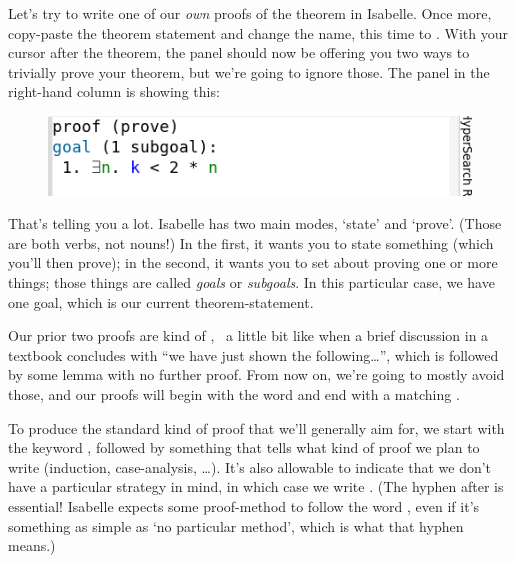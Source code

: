 
Let's try to write one of our \textit{own} proofs of the theorem in Isabelle. Once more, copy-paste the theorem statement and change the name, this time to . With your cursor after the theorem, the  panel should now be offering you two ways to trivially prove your theorem, but we're going to ignore those. The  panel in the right-hand column is showing this:
\begin{figure}[h]
    \includegraphics[width=0.75\linewidth]{TEXT/C01/Images/state-panel.png}
\end{figure}

That's telling you a lot. Isabelle has two main modes, `state' and `prove'. (Those are both verbs, not nouns!) In the first, it wants you to state something (which you'll then prove); in the second, it wants you to set about proving one or more things; those things are called \textit{goals} or \textit{subgoals}. In this particular case, we have one goal, which is our current theorem-statement. 

Our prior two proofs are kind of ,  a little bit like when a brief discussion in a textbook concludes with ``we have just shown the following…'', which is followed by some lemma with no further proof. From now on, we're going to mostly avoid those, and our proofs will begin with the word  and end with a matching . 

To produce the standard kind of proof that we'll generally aim for, we start with the keyword , followed by something that tells what kind of proof we plan to write (induction, case-analysis, \ldots ). It's also allowable to indicate that we don't have a particular strategy in mind, in which case we write . (The hyphen after  is essential! Isabelle expects some proof-method to follow the word , even if it's something as simple as `no particular method', which is what that hyphen means.)

